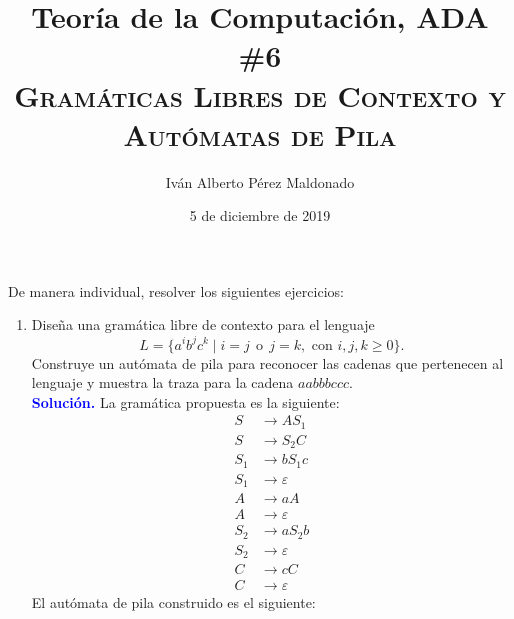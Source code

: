 \documentclass[11pt,fleqn]{article}
\title{Teoría de la Computación, ADA \#6 \\ \textsc{Gramáticas Libres de Contexto y Autómatas de Pila}}
\author{Iván Alberto Pérez Maldonado}
\date{5 de diciembre de 2019}
\newcommand{\solution}{\textcolor{blue}{\textbf{Solución. }}}
\begin{document}
\maketitle

De manera individual, resolver los siguientes ejercicios:
\begin{enumerate}
    \item Diseña una gramática libre de contexto para el lenguaje $$L = \{ a^ib^jc^k \mid i=j \ \ \text{o} \ \ j=k, \text{   con   } i,j,k \geq 0 \}.$$ Construye un autómata de pila para reconocer las cadenas que pertenecen al lenguaje y muestra la traza para la cadena $aabbbccc$. \\
    \solution La gramática propuesta es la siguiente:
    \begin{align*}
        S &\rightarrow AS_1 \\ 
        S &\rightarrow S_2C \\
        S_1 &\rightarrow bS_1c \\
        S_1 &\rightarrow \varepsilon \\
        A &\rightarrow aA \\
        A &\rightarrow \varepsilon \\
        S_2 &\rightarrow aS_2b \\
        S_2 &\rightarrow \varepsilon \\
        C &\rightarrow cC \\
        C &\rightarrow \varepsilon
    \end{align*}
    El autómata de pila construido es el siguiente:
    \begin{center}
\end{center}
\end{enumerate}
\end{document}
